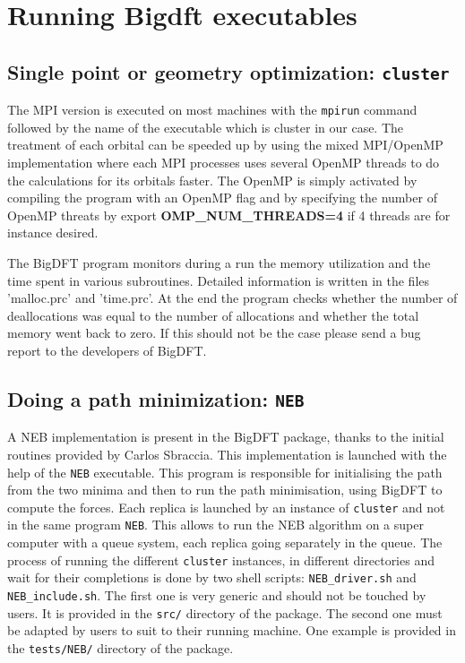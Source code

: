 \documentclass[a4paper,11pt]{report}
\begin{document}
\chapter{ Running Bigdft executables}

\section{Single point or geometry optimization: \texttt{cluster}}
The MPI version is executed on most machines with the \texttt{mpirun} command followed by the name of the executable which is 
cluster in our case.
The treatment of each orbital can be speeded up by using the mixed MPI/OpenMP implementation 
where each MPI processes uses several OpenMP threads to do the calculations for its orbitals faster. 
The OpenMP is simply activated by compiling the program with an OpenMP flag and by specifying the number of OpenMP threats by
export \textbf{OMP\_NUM\_THREADS=4} if 4 threads are for instance desired.

\noindent
The BigDFT program monitors during a run the memory utilization and the time spent in various subroutines. Detailed information 
is written in the files 'malloc.prc' and 'time.prc'. At the end the program checks whether the number of deallocations was equal 
to the number of allocations and whether the total memory went back to zero. If this should not be the case please send a bug report to the developers of BigDFT.

\section{Doing a path minimization: \texttt{NEB}}
A NEB implementation is present in the BigDFT package, thanks to the initial routines provided by Carlos Sbraccia. This implementation is launched with the help of the \texttt{NEB} executable. This program is responsible for initialising the path from the two minima and then to run the path minimisation, using BigDFT to compute the forces. Each replica is launched by an instance of \texttt{cluster} and not in the same program \texttt{NEB}. This allows to run the NEB algorithm on a super computer with a queue system, each replica going separately in the queue. 
The process of running the different \texttt{cluster} instances, in different directories and wait for their completions is done by two shell scripts: \texttt{NEB\_driver.sh} and \texttt{NEB\_include.sh}. The first one is very generic and should not be touched by users. It is provided in the \texttt{src/} directory of the package. The second one must be adapted by users to suit to their running machine. One example is provided in the \texttt{tests/NEB/} directory of the package.
\end{document}
